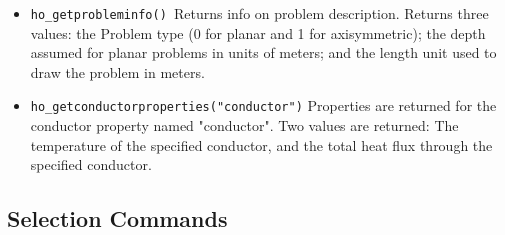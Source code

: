 \begin{itemize}
For example, if one wanted to plot $V $ to the screen with 200 points evaluated
to make the graph, the command would be: \newline
\texttt{ho\_makeplot(0,200) } \newline
To write the data to disk instead of plotting it, the command would be of
the form:\texttt{ } \newline
\texttt{ho\_makeplot(0,200,"c:temp.txt")} \newline


\item \texttt{ho\_getprobleminfo() }Returns info on problem description. Returns three
values: the Problem type (0 for planar and 1 for axisymmetric); the depth
assumed for planar problems in units of meters; and the length unit used to draw the
problem in meters.

\item \texttt{ho\_getconductorproperties("conductor")} Properties are returned for the
conductor property named "conductor". Two values are returned: The temperature
of the specified conductor, and the total heat flux through the specified
conductor.
\end{itemize}

\subsection{Selection Commands}

